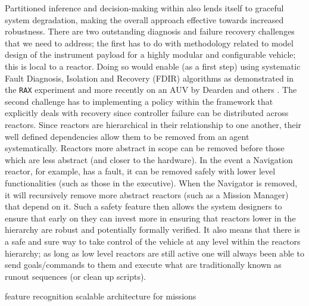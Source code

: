 Partitioned inference and decision-making within \rx also lends itself
to graceful system degradation, making the overall approach effective
towards increased robustness. There are two outstanding diagnosis and
failure recovery challenges that we need to address; the first has to
do with methodology related to model design of the instrument payload
for a highly modular and configurable vehicle; this is local to a
reactor. Doing so would enable (as a first step) using systematic
Fault Diagnosis, Isolation and Recovery (FDIR) algorithms as
demonstrated in the \texttt{RAX} experiment
\cite{williams96,mus98,williams97} and more recently on an AUV by
Dearden and others \cite{wang09,ernits10,dearden11}. The second
challenge has to implementing a policy within the \rx framework that
explicitly deals with recovery since controller failure can be
distributed across reactors. Since reactors are hierarchical in their
relationship to one another, their well defined dependencies allow
them to be removed from an agent systematically. Reactors more
abstract in scope can be removed before those which are less abstract
(and closer to the hardware). In the event a Navigation reactor, for
example, has a fault, it can be removed safely with lower level
functionalities (such as those in the executive). When the Navigator
is removed, it will recursively remove more abstract reactors (such as
a Mission Manager) that depend on it. Such a safety feature then
allows the system designers to ensure that early on they can invest
more in ensuring that reactors lower in the hierarchy are robust and
potentially formally verified. It also means that there is a safe and
sure way to take control of the vehicle at any level within the
reactors hierarchy; as long as low level reactors are still active one
will always been able to send goals/commands to them and execute what
are traditionally known as runout sequences (or clean up scripts).




feature recognition
scalable architecture for missions




